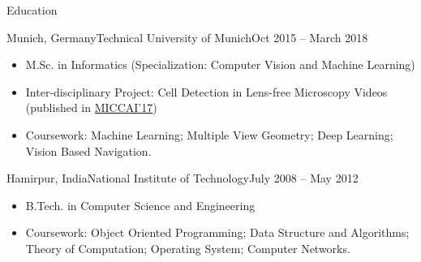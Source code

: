 \documentclass[]{mcdowellcv}
\begin{document}
	\begin{cvsection}{Education}
	\begin{cvsubsection}{Munich, Germany}{Technical University of Munich}{Oct 2015 -- March 2018}
		\begin{itemize}
			\item M.Sc. in Informatics (Specialization: Computer Vision and Machine Learning)
			\item Inter-disciplinary Project: Cell Detection in Lens-free Microscopy Videos (published in \href{https://link.springer.com/chapter/10.1007/978-3-319-66185-8_1}{MICCAI'17})
			\item Coursework: Machine Learning; Multiple View Geometry; Deep Learning; Vision Based Navigation.
		\end{itemize}
	\end{cvsubsection}
	\begin{cvsubsection}{Hamirpur, India}{National Institute of Technology}{July 2008 -- May 2012}
		\begin{itemize}
			\item B.Tech. in Computer Science and Engineering
			\item Coursework: Object Oriented Programming; Data Structure and Algorithms; Theory of Computation; Operating System; Computer Networks.
		\end{itemize}
	\end{cvsubsection}
	\end{cvsection}
	
\end{document}
